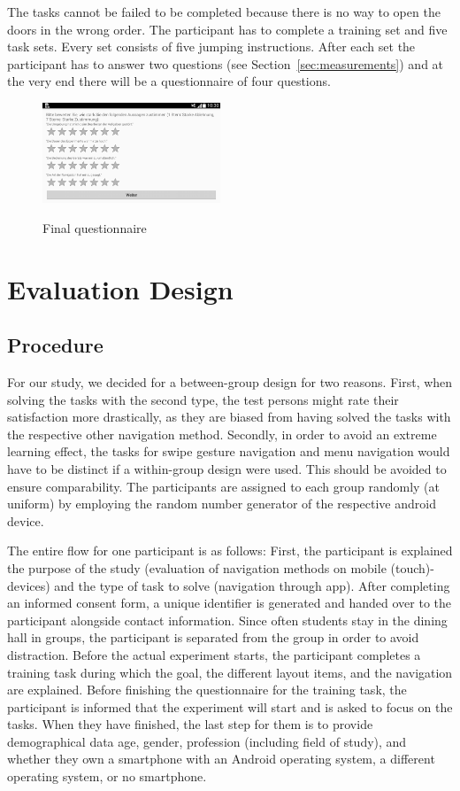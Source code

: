 \documentclass{sig-alternate-05-2015}
\begin{document}
The tasks cannot be failed to be completed because there is no way to open the doors in the wrong order. The participant has to complete a training set and five task sets. Every set consists of five jumping instructions. After each set the participant has to answer two questions (see Section~\ref{sec:measurements}) and at the very end there will be a questionnaire of four questions.
\begin{figure}
	\centering
	\includegraphics[width=0.475\textwidth]{pics/screenshots/global5-cut}\label{fig:final_questionnaire}
	\caption{Final questionnaire}
\end{figure}
\section{Evaluation Design}
\subsection{Procedure}
For our study, we decided for a between-group design for two reasons. First,
when solving the tasks with the second type, the test persons might rate their
satisfaction more drastically, as they are biased from having solved the tasks
with the respective other navigation method. Secondly, in order to avoid an
extreme learning effect, the tasks for swipe gesture navigation and menu
navigation would have to be distinct if a within-group design were used. This
should be avoided to ensure comparability. The participants are assigned to
each group randomly (at uniform) by employing the random number generator of
the respective android device.

The entire flow for one participant is as follows: First, the participant is explained
the purpose of the study (evaluation of navigation methods on mobile (touch)-devices) and the
type of task to solve (navigation through app). After completing an informed consent form, a unique
identifier is generated and handed over to the participant alongside contact information. Since often students
stay in the dining hall in groups, the participant is separated from the group in order to avoid distraction. 
Before the actual experiment starts, the participant completes a training task during which the goal, the
different layout items, and the navigation are explained. Before finishing the questionnaire for the training
task, the participant is informed that the experiment will start and is asked to focus on the tasks. When they have
finished, the last step for them is to provide demographical data age, gender, profession (including field of study),
and whether they own a smartphone with an Android operating system, a different operating system, or no smartphone.
\end{document}
